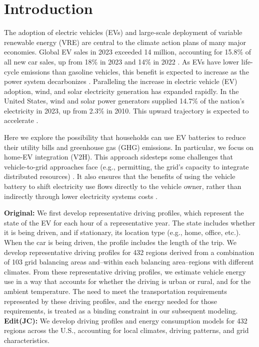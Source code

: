 \documentclass[11pt,preprint]{elsarticle}
\begin{document}
\section{Introduction}
The adoption of electric vehicles (EVs) and large-scale deployment of variable renewable energy (VRE) are central to the climate action plans of many major economies. Global EV sales in 2023 exceeded 14 million, accounting for 15.8\% of all new car sales, up from 18\% in 2023 and 14\% in 2022 \cite{
alsauskas_global_2024}. As EVs have lower life-cycle emissions than gasoline vehicles, this benefit is expected to increase as the power system decarbonizes \cite{he_economic_2019}. Paralleling the increase in electric vehicle (EV) adoption, wind, and solar electricity generation has expanded rapidly. In the United States, wind and solar power generators supplied 14.7\% of the nation's electricity in 2023, up from 2.3\% in 2010. This upward trajectory is expected to accelerate \cite{noauthor_annual_2023,gagnon_2023_2023}.

Here we explore the possibility that households can use EV batteries to reduce their utility bills and greenhouse gas (GHG) emissions. In particular, we focus on home-EV integration (V2H). This approach sidesteps some challenges that vehicle-to-grid approaches face (e.g., permitting, the grid's capacity to integrate distributed resources) \cite{sovacool_beyond_2009,sovacool_future_2017}. It also ensures that the benefits of using the vehicle battery to shift electricity use flows directly to the vehicle owner, rather than indirectly through lower electricity systems costs \cite{peterson_economics_2010}.

\textbf{Original:}
We first develop representative driving profiles, which represent the state of the EV for each hour of a representative year. The state includes whether it is being driven, and if stationary, its location type (e.g., home, office, etc.). When the car is being driven, the profile includes the length of the trip. We develop representative driving profiles for 432 regions derived from a combination of 103 grid balancing areas and--within each balancing area--regions with different climates. From these representative driving profiles, we estimate vehicle energy use in a way that accounts for whether the driving is urban or rural, and for the ambient temperature. The need to meet the transportation requirements represented by these driving profiles, and the energy needed for those requirements, is treated as a binding constraint in our subsequent modeling. 
\textbf{Edit(JC):} 
We develop driving profiles and energy consumption models for 432 regions across the U.S., accounting for local climates, driving patterns, and grid characteristics.
\end{document}
